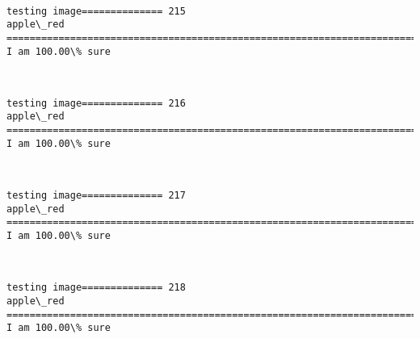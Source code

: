 \documentclass[11pt]{article}
\begin{document}
    \begin{center}
    \end{center}
    { \hspace*{\fill} \\}
    
    \begin{Verbatim}[commandchars=\\\{\}]
testing image============== 215
apple\_red
============================================================================
I am 100.00\% sure

    \end{Verbatim}

    \begin{center}
    \end{center}
    { \hspace*{\fill} \\}
    
    \begin{Verbatim}[commandchars=\\\{\}]
testing image============== 216
apple\_red
============================================================================
I am 100.00\% sure

    \end{Verbatim}

    \begin{center}
    \end{center}
    { \hspace*{\fill} \\}
    
    \begin{Verbatim}[commandchars=\\\{\}]
testing image============== 217
apple\_red
============================================================================
I am 100.00\% sure

    \end{Verbatim}

    \begin{center}
    \end{center}
    { \hspace*{\fill} \\}
    
    \begin{Verbatim}[commandchars=\\\{\}]
testing image============== 218
apple\_red
============================================================================
I am 100.00\% sure

    \end{Verbatim}
\end{document}

